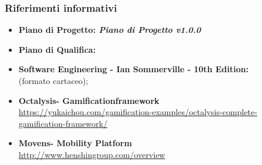 \subsubsection {Riferimenti informativi}
\begin{itemize}
	\item \textbf{Piano di Progetto: \textit{Piano di Progetto v1.0.0}}
	\item \textbf{Piano di Qualifica:}
	\item \textbf{Software Engineering - Ian Sommerville - 10th Edition: \\}(formato cartaceo);
	\item \textbf{Octalysis\glosp - Gamification\glosp framework\glosp \\}
	\href{https://yukaichou.com/gamification-examples/octalysis-complete-gamification-framework/}{https://yukaichou.com/gamification-examples/octalysis-complete-gamification-framework/}
	\item \textbf{Movens\glosp - Mobility Platform \\}
	\href{http://www.henshingroup.com/overview/}{http://www.henshingroup.com/overview} 
\end{itemize}